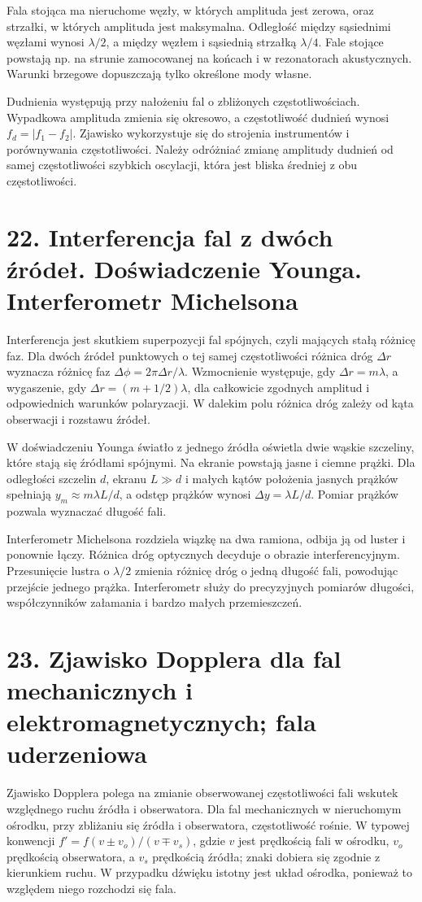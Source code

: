 \documentclass[11pt,a4paper,oneside]{report}
\begin{document}
Fala stojąca ma nieruchome węzły, w których amplituda jest zerowa, oraz strzałki, w których amplituda jest maksymalna. Odległość między sąsiednimi węzłami wynosi \(\lambda/2\), a między węzłem i sąsiednią strzałką \(\lambda/4\). Fale stojące powstają np. na strunie zamocowanej na końcach i w rezonatorach akustycznych. Warunki brzegowe dopuszczają tylko określone mody własne.

Dudnienia występują przy nałożeniu fal o zbliżonych częstotliwościach. Wypadkowa amplituda zmienia się okresowo, a częstotliwość dudnień wynosi \(f_d=|f_1-f_2|\). Zjawisko wykorzystuje się do strojenia instrumentów i porównywania częstotliwości. Należy odróżniać zmianę amplitudy dudnień od samej częstotliwości szybkich oscylacji, która jest bliska średniej z obu częstotliwości.

\section{22. Interferencja fal z dwóch źródeł. Doświadczenie Younga. Interferometr Michelsona}
Interferencja jest skutkiem superpozycji fal spójnych, czyli mających stałą różnicę faz. Dla dwóch źródeł punktowych o tej samej częstotliwości różnica dróg \(\Delta r\) wyznacza różnicę faz \(\Delta\phi=2\pi\Delta r/\lambda\). Wzmocnienie występuje, gdy \(\Delta r=m\lambda\), a wygaszenie, gdy \(\Delta r=(m+1/2)\lambda\), dla całkowicie zgodnych amplitud i odpowiednich warunków polaryzacji. W dalekim polu różnica dróg zależy od kąta obserwacji i rozstawu źródeł.

W doświadczeniu Younga światło z jednego źródła oświetla dwie wąskie szczeliny, które stają się źródłami spójnymi. Na ekranie powstają jasne i ciemne prążki. Dla odległości szczelin \(d\), ekranu \(L\gg d\) i małych kątów położenia jasnych prążków spełniają \(y_m\approx m\lambda L/d\), a odstęp prążków wynosi \(\Delta y=\lambda L/d\). Pomiar prążków pozwala wyznaczać długość fali.

Interferometr Michelsona rozdziela wiązkę na dwa ramiona, odbija ją od luster i ponownie łączy. Różnica dróg optycznych decyduje o obrazie interferencyjnym. Przesunięcie lustra o \(\lambda/2\) zmienia różnicę dróg o jedną długość fali, powodując przejście jednego prążka. Interferometr służy do precyzyjnych pomiarów długości, współczynników załamania i bardzo małych przemieszczeń.

\section{23. Zjawisko Dopplera dla fal mechanicznych i elektromagnetycznych; fala uderzeniowa}
Zjawisko Dopplera polega na zmianie obserwowanej częstotliwości fali wskutek względnego ruchu źródła i obserwatora. Dla fal mechanicznych w nieruchomym ośrodku, przy zbliżaniu się źródła i obserwatora, częstotliwość rośnie. W typowej konwencji \(f'=f(v\pm v_o)/(v\mp v_s)\), gdzie \(v\) jest prędkością fali w ośrodku, \(v_o\) prędkością obserwatora, a \(v_s\) prędkością źródła; znaki dobiera się zgodnie z kierunkiem ruchu. W przypadku dźwięku istotny jest układ ośrodka, ponieważ to względem niego rozchodzi się fala.
\end{document}
